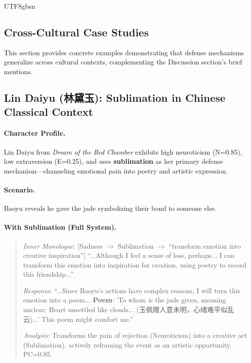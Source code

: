\documentclass[11pt]{article}
\begin{document}
\begin{CJK*}{UTF8}{gbsn}
\subsection{Cross-Cultural Case Studies}
\label{sec:crosscultural_cases}

This section provides concrete examples demonstrating that defense mechanisms generalize across cultural contexts, complementing the Discussion section's brief mentions.

\subsection{Lin Daiyu (林黛玉): Sublimation in Chinese Classical Context}

\paragraph{Character Profile.} Lin Daiyu from \textit{Dream of the Red Chamber} exhibits high neuroticism (N=0.85), low extraversion (E=0.25), and uses \textbf{sublimation} as her primary defense mechanism---channeling emotional pain into poetry and artistic expression.

\paragraph{Scenario.} Baoyu reveals he gave the jade symbolizing their bond to someone else.

\paragraph{With Sublimation (Full System).}
\begin{quote}
\textit{Inner Monologue}: [Sadness $\rightarrow$ Sublimation $\rightarrow$ ``transform emotion into creative inspiration''] ``...Although I feel a sense of loss, perhaps... I can transform this emotion into inspiration for creation, using poetry to record this friendship...''

\textit{Response}: ``...Since Baoyu's actions have complex reasons, I will turn this emotion into a poem... \textbf{Poem}: 'To whom is the jade given, meaning unclear; Heart unsettled like clouds... (玉佩赠人意未明，心绪难平似乱云)...' This poem might comfort me.''

\textit{Analysis}: Transforms the pain of rejection (Neuroticism) into a creative act (Sublimation), actively reframing the event as an artistic opportunity. PC=0.85.
\end{quote}


\end{CJK*}
\end{document}
